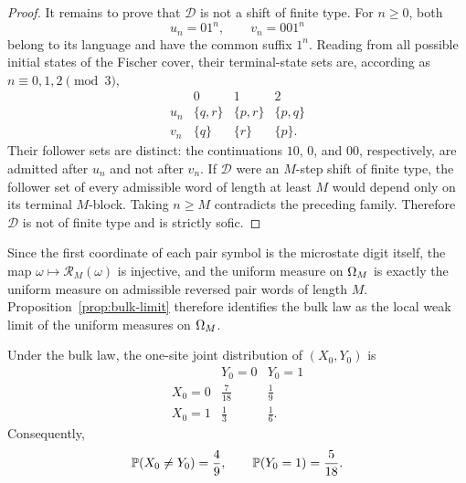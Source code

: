 \begin{proof}
It remains to prove that \(\mathcal D\) is not a shift of finite type.  For
\(n\ge0\), both
\[
u_n=01^n,
\qquad
v_n=001^n
\]
belong to its language and have the common suffix \(1^n\).  Reading from
all possible initial states of the Fischer cover, their terminal-state sets
are, according as \(n\equiv0,1,2\pmod3\),
\[
\begin{array}{c|ccc}
 &0&1&2\\ \hline
u_n&\{q,r\}&\{p,r\}&\{p,q\}\\
v_n&\{q\}&\{r\}&\{p\}.
\end{array}
\]
Their follower sets are distinct: the continuations \(10\), \(0\), and
\(00\), respectively, are admitted after \(u_n\) and not after \(v_n\).
If \(\mathcal D\) were an \(M\)-step shift of finite type, the follower set
of every admissible word of length at least \(M\) would depend only on its
terminal \(M\)-block.  Taking \(n\ge M\) contradicts the preceding family.
Therefore \(\mathcal D\) is not of finite type and is strictly sofic.
\end{proof}

Since the first coordinate of each pair symbol is the microstate digit itself, the map \(\omega\mapsto \mathcal{R}_M(\omega)\) is injective, and the uniform measure on \(\Omega_M\) is exactly the uniform measure on admissible reversed pair words of length \(M\). Proposition~\ref{prop:bulk-limit} therefore identifies the bulk law as the local weak limit of the uniform measures on \(\Omega_M\).

\begin{theorem}\label{thm:joint}
Under the bulk law, the one-site joint distribution of \((X_0,Y_0)\) is
\[
\begin{array}{c|cc}
& Y_0=0 & Y_0=1\\\hline
X_0=0 & \frac{7}{18} & \frac{1}{9}\\
X_0=1 & \frac{1}{3} & \frac{1}{6}.
\end{array}
\]
Consequently,
\[
\mathbb{P}(X_0\neq Y_0)=\frac{4}{9},
\qquad
\mathbb{P}(Y_0=1)=\frac{5}{18}.
\]
\end{theorem}

